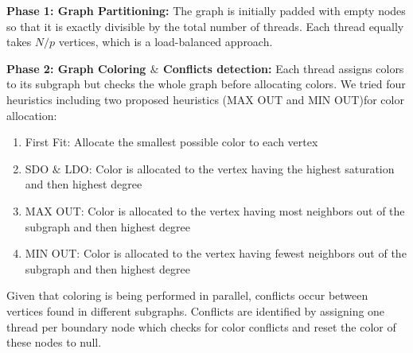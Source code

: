 \documentclass[preprint]{sigplanconf}
\begin{document}
\textbf{Phase 1: Graph Partitioning:}
The graph is initially padded with empty nodes so that it is exactly divisible by the total number of threads. Each thread equally takes $N/p$ vertices, which is a load-balanced approach.



\textbf{Phase 2: Graph Coloring $\&$ Conflicts detection:}
Each thread assigns colors to its subgraph but checks the whole graph before allocating colors. We tried four heuristics including two proposed heuristics (MAX OUT and MIN OUT)for color allocation:
\renewcommand{\labelenumi}{\roman{enumi}) } 
\begin{enumerate}
  \item First Fit: Allocate the smallest possible color to each vertex
  \item SDO $\&$ LDO: Color is allocated to the vertex having the highest saturation and then highest degree
  \item MAX OUT: Color is allocated to the vertex having most neighbors out of the subgraph and then highest degree
  \item MIN OUT: Color is allocated to the vertex having fewest neighbors out of the subgraph and then highest degree
\end{enumerate}

Given that coloring is being performed in parallel, conflicts occur between vertices found in different subgraphs. Conflicts are identified by assigning one thread per boundary node which checks for color conflicts and reset the color of these nodes to null.

\end{document}
